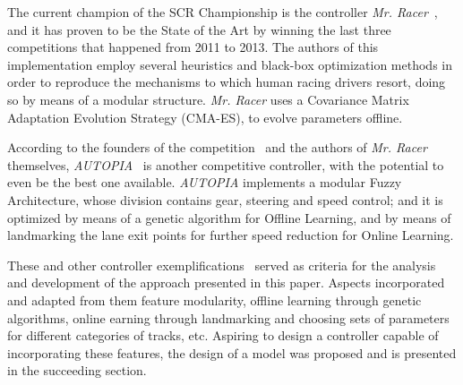 	The current champion of the SCR Championship is the controller \emph{Mr. Racer}~\cite{MrRacer}, and it has proven to be the State of the Art by winning the last three competitions that happened from 2011 to 2013. The authors of this implementation employ several heuristics and black-box optimization methods in order to reproduce the mechanisms to which human racing drivers resort, doing so by means of a modular structure. \emph{Mr. Racer} uses a Covariance Matrix Adaptation Evolution Strategy (CMA-ES), to evolve parameters offline.
	
	According to the founders of the competition~\cite{SCRC} and the authors of \emph{Mr. Racer} themselves, \emph{AUTOPIA}~\cite{AUTOPIA} is another competitive controller, with the potential to even be the best one available. \emph{AUTOPIA} implements a modular Fuzzy Architecture, whose division contains gear, steering and speed control; and it is optimized by means of a genetic algorithm for Offline Learning, and by means of landmarking the lane exit points for further speed reduction for Online Learning.
	
	These and other controller exemplifications~\cite{SCRC} served as criteria for the analysis and development of the approach presented in this paper. Aspects incorporated and adapted from them feature modularity, offline learning through genetic algorithms, online earning through landmarking and choosing sets of parameters for different categories of tracks, etc. Aspiring to design a controller capable of incorporating these features, the design of a model was proposed and is presented in the succeeding section.
	

